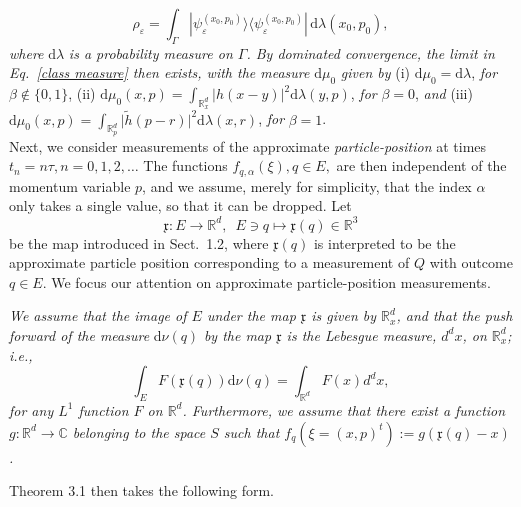 \documentclass[11pt]{article}
\begin{document}
$$\rho_{\varepsilon} = \int_{\Gamma} |\psi_{\varepsilon}^{(x_0,p_0)}\rangle \langle \psi_{\varepsilon}^{(x_0,p_0)}| \,
\text{d}\lambda(x_0, p_0), $$
\textit{where} $\text{d}\lambda$ \textit{is a probability measure on $\Gamma$. By dominated convergence, the limit in 
Eq.~\eqref{class measure} then exists, with the measure} $\text{d}\mu_0$ \textit{given by} (i) $\text{d}\mu_0 = \text{d}\lambda$, \textit{for} $\beta\notin \{0,1\}$, (ii) $\text{d}\mu_{0}(x, p) = \int_{\mathbb{R}_{x}^{d}} \vert h(x-y)\vert^{2} \text{d}\lambda(y,p)$,
\textit{for} $\beta =0$, \textit{and} (iii) $\text{d}\mu_0 (x, p) = \int_{\mathbb{R}_{p}^{d}} \vert \widetilde{h}(p-r)\vert^{2} 
\text{d}\lambda(x,r)$, \textit{for} $\beta=1$.\\

Next, we consider measurements of the approximate \textit{particle-position} at times $t_n= n\tau, n=0,1,2,\dots$ 
The functions $f_{q, \alpha}(\xi), q\in E,$ are then independent of the momentum variable $p$, and we assume,
merely for simplicity, that the index $\alpha$ only takes a single value, so that it can be dropped. Let
$$\mathfrak{x}: E \rightarrow \mathbb{R}^{d}, \,\,\,E\ni q \mapsto \mathfrak{x}(q) \in \mathbb{R}^{3}$$
be the map introduced in Sect.~1.2, where $\mathfrak{x}(q)$ is interpreted to be the approximate particle position 
corresponding to a measurement of $Q$ with outcome $q\in E$. We focus our attention on approximate particle-position 
measurements.

\vspace{0.15cm} \textit{We assume that 
the image of $E$ under the map $\mathfrak{x}$ is given by $\mathbb{R}^{d}_{x}$, and
that the push forward of the measure} d$\nu(q)$ \textit{by the map $\mathfrak{x}$ is 
the Lebesgue measure, $d^{d}x$, on $\mathbb{R}^{d}_{x}$; i.e.,}
\begin{equation}\label{transl-invariance}
\int_{E} F(\mathfrak{x}(q)) \text{d}\nu(q) = \int_{\mathbb{R}^{d}} F(x) d^{d}x,
\end{equation}
\textit{for any $L^1$ function $F$ on $\mathbb{R}^{d}$.
Furthermore, we assume that there exist a function 
\mbox{$g: \mathbb{R}^{d}\rightarrow \mathbb{C}$} belonging to the space $S$ such that 
\mbox{$f_{q}(\xi=(x,p)^{t}) := g(\mathfrak{x}(q)-x)$}.}

\vspace{0.15cm}Theorem 3.1 then takes the following form.
\end{document}
